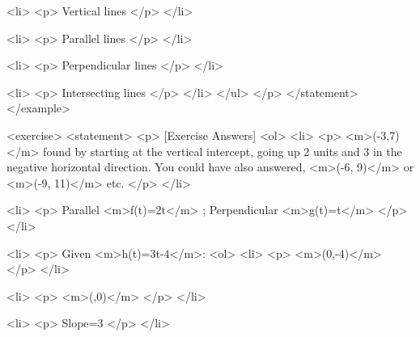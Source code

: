                         <li>
                            <p>
                                Vertical lines
                            </p>
                        </li>

                        <li>
                            <p>
                                Parallel lines
                            </p>
                        </li>

                        <li>
                            <p>
                                Perpendicular lines
                            </p>
                        </li>

                        <li>
                            <p>
                                Intersecting lines
                            </p>
                        </li>
                    </ul>
                </p>
            </statement>
        </example>

        <exercise>
            <statement>
                <p>
                    [Exercise Answers]
                    <ol>
                        <li>
                            <p>
                                <m>(-3,7)</m> found by starting at the vertical intercept, going up 2 units and 3 in the negative horizontal direction. You could have also answered, <m>(-6, 9)</m> or <m>(-9, 11)</m> etc.
                            </p>
                        </li>

                        <li>
                            <p>
                                Parallel <m>f(t)=2t</m> ; Perpendicular <m>g(t)=t</m>
                            </p>
                        </li>

                        <li>
                            <p>
                                Given <m>h(t)=3t-4</m>:
                                <ol>
                                    <li>
                                        <p>
                                            <m>(0,-4)</m>
                                        </p>
                                    </li>

                                    <li>
                                        <p>
                                            <m>(,0)</m>
                                        </p>
                                    </li>

                                    <li>
                                        <p>
                                            Slope=3
                                        </p>
                                    </li>

